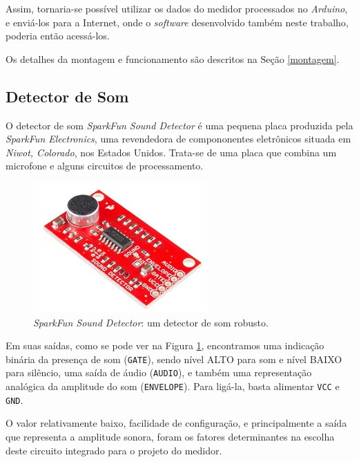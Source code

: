 \documentclass[
    12pt,               %
    openright,          %
    oneside,
    a4paper,            
    english,            %
    brazil              %
    ]{abntex2}
\begin{document}
Assim, tornaria-se possível utilizar os dados do medidor processados no \textit{Arduino}, e enviá-los para a Internet, onde o \textit{software} desenvolvido também neste trabalho, poderia então acessá-los.

Os detalhes da montagem e funcionamento são descritos na Seção \ref{montagem}.

\subsection{Detector de Som}

O detector de som \textit{SparkFun Sound Detector} é uma pequena placa produzida pela \textit{SparkFun Electronics}, uma revendedora de compononentes eletrônicos situada em \textit{Niwot, Colorado}, nos Estados Unidos. Trata-se de uma placa que combina um microfone e alguns circuitos de processamento. 

\begin{figure}[!htb]
  \begin{center}
    \caption{\label{spark}\textit{SparkFun Sound Detector}: um detector de som robusto.}
    \includegraphics[scale=0.5]{images/spark.jpg}
  \end{center}
\end{figure}

Em suas saídas, como se pode ver na Figura \ref{spark}, encontramos uma indicação binária da presença de som (\texttt{GATE}), sendo nível ALTO para som e nível BAIXO para silêncio, uma saída de áudio (\texttt{AUDIO}), e também uma representação analógica da amplitude do som (\texttt{ENVELOPE}). Para ligá-la, basta alimentar \texttt{VCC} e \texttt{GND}.

O valor relativamente baixo, facilidade de configuração, e principalmente a saída que representa a amplitude sonora, foram os fatores determinantes na escolha deste circuito integrado para o projeto do medidor.
\end{document}
